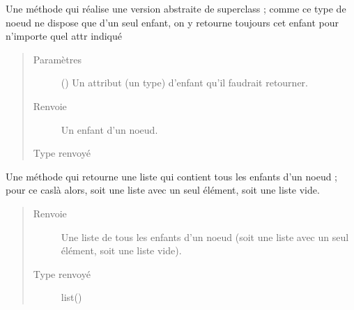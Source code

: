 \documentclass[letterpaper,10pt,french]{sphinxmanual}
\begin{document}
\begin{fulllineitems}
\begin{fulllineitems}
\label{\detokenize{index:StrategyTree.Repair.get_child_by_attribute}}
Une méthode qui réalise une version abstraite de superclass ; comme ce type de noeud ne dispose que d’un seul
enfant, on y retourne toujours cet enfant pour n’importe quel attr indiqué
\begin{quote}\begin{description}
\item[{Paramètres}] \leavevmode
{} () \textendash{} Un attribut (un type) d’enfant qu’il faudrait retourner.

\item[{Renvoie}] \leavevmode
{} \textendash{} Un enfant d’un noeud.

\item[{Type renvoyé}] \leavevmode
{\hyperref[\detokenize{index:StrategyTree.NodeST}]{}}

\end{description}\end{quote}

\end{fulllineitems}


\begin{fulllineitems}
\label{\detokenize{index:StrategyTree.Repair.get_list_of_children}}
Une méthode qui retourne une liste qui contient tous les enfants d’un noeud ; pour ce cas\sphinxhyphen{}là alors, soit
une liste avec un seul élément, soit une liste vide.
\begin{quote}\begin{description}
\item[{Renvoie}] \leavevmode
{} \textendash{} Une liste de tous les enfants d’un noeud (soit une liste avec un seul élément, soit une liste vide).

\item[{Type renvoyé}] \leavevmode
list({\hyperref[\detokenize{index:StrategyTree.NodeST}]{}})

\end{description}\end{quote}


\end{fulllineitems}
\end{fulllineitems}
\end{document}
